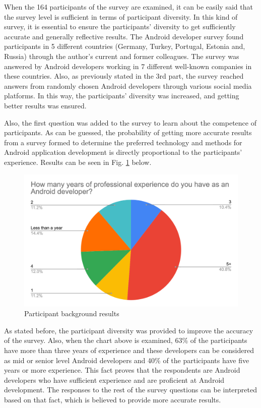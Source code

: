 When the 164 participants of the survey are examined, it can be easily said that the survey level is sufficient in terms of participant diversity. In this kind of survey, it is essential to ensure the participants’ diversity to get sufficiently accurate and generally reflective results. The Android developer survey found participants in 5 different countries (Germany, Turkey, Portugal, Estonia and, Russia) through the author's current and former colleagues. The survey was answered by Android developers working in 7 different well-known companies in these countries. Also, as previously stated in the 3rd part, the survey reached answers from randomly chosen Android developers through various social media platforms. In this way, the participants’ diversity was increased, and getting better results was ensured. 

Also, the first question was added to the survey to learn about the competence of participants. As can be guessed, the probability of getting more accurate results from a survey formed to determine the preferred technology and methods for Android application development is directly proportional to the participants’ experience. Results can be seen in Fig. \ref{fig:participant_bg} below.
\begin{figure}[ht!]
    \centering
    \includegraphics[scale=0.25]{figures/dev_experience.png}
    \caption{Participant background results}
    \label{fig:participant_bg}
\end{figure}
\FloatBarrier

As stated before, the participant diversity was provided to improve the accuracy of the survey. Also, when the chart above is examined, 63\% of the participants have more than three years of experience and these developers can be considered as mid or senior level Android developers and 40\% of the participants have five years or more experience. This fact proves that the respondents are Android developers who have sufficient experience and are proficient at Android development. The responses to the rest of the survey questions can be interpreted based on that fact, which is believed to provide more accurate results.